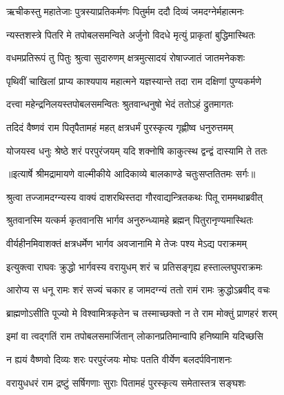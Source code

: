 \twolineshloka
{ऋचीकस्तु महातेजाः पुत्रस्याप्रतिकर्मणः}
{पितुर्मम ददौ दिव्यं जमदग्नेर्महात्मनः} %

\twolineshloka
{न्यस्तशस्त्रे पितरि मे तपोबलसमन्विते}
{अर्जुनो विदधे मृत्युं प्राकृतां बुद्धिमास्थितः} %

\twolineshloka
{वधमप्रतिरूपं तु पितुः श्रुत्वा सुदारुणम्}
{क्षत्रमुत्सादयं रोषाज्जातं जातमनेकशः} %

\twolineshloka
{पृथिवीं चाखिलां प्राप्य काश्यपाय महात्मने}
{यज्ञस्यान्ते तदा राम दक्षिणां पुण्यकर्मणे} %

\twolineshloka
{दत्त्वा महेन्द्रनिलयस्तपोबलसमन्वितः}
{श्रुतवान्धनुषो भेदं ततोऽहं द्रुतमागतः} %

\twolineshloka
{तदिदं वैष्णवं राम पितृपैतामहं महत्}
{क्षत्रधर्मं पुरस्कृत्य गृह्णीष्व धनुरुत्तमम्} %

\twolineshloka
{योजयस्व धनुः श्रेष्ठे शरं परपुरंजयम्}
{यदि शक्नोषि काकुत्स्थ द्वन्द्वं दास्यामि ते ततः} %


{॥इत्यार्षे श्रीमद्रामायणे वाल्मीकीये आदिकाव्ये बालकाण्डे चतुःसप्ततितमः सर्गः॥}


\twolineshloka
{श्रुत्वा तज्जामदग्न्यस्य वाक्यं दाशरथिस्तदा}
{गौरवाद्यन्त्रितकथः पितू राममथाब्रवीत्} %

\twolineshloka
{श्रुतवानस्मि यत्कर्म कृतवानसि भार्गव}
{अनुरुन्ध्यामहे ब्रह्मन् पितुरानृण्यमास्थितः} %

\twolineshloka
{वीर्यहीनमिवाशक्तं क्षत्रधर्मेण भार्गव}
{अवजानामि मे तेजः पश्य मेऽद्य पराक्रमम्} %

\twolineshloka
{इत्युक्त्वा राघवः क्रुद्धो भार्गवस्य वरायुधम्}
{शरं च प्रतिसङ्गृह्य हस्ताल्लघुपराक्रमः} %

\twolineshloka
{आरोप्य स धनू रामः शरं सज्यं चकार ह}
{जामदग्न्यं ततो रामं रामः क्रुद्धोऽब्रवीद् वचः} %

\twolineshloka
{ब्राह्मणोऽसीति पूज्यो मे विश्वामित्रकृतेन च}
{तस्माच्छक्तो न ते राम मोक्तुं प्राणहरं शरम्} %

\twolineshloka
{इमां वा त्वद्गतिं राम तपोबलसमार्जितान्}
{लोकानप्रतिमान्वापि हनिष्यामि यदिच्छसि} %

\twolineshloka
{न ह्ययं वैष्णवो दिव्यः शरः परपुरंजयः}
{मोघः पतति वीर्येण बलदर्पविनाशनः} %

\twolineshloka
{वरायुधधरं राम द्रष्टुं सर्षिगणाः सुराः}
{पितामहं पुरस्कृत्य समेतास्तत्र सङ्घशः} %

